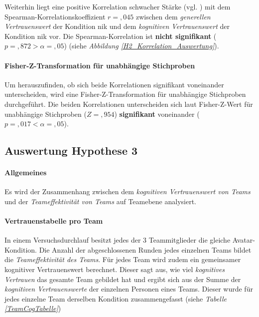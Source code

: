 \documentclass[a4paper,11pt]{article}%
\renewcommand{\\}{\vspace*{0.5\baselineskip} \newline}
\begin{document}
{Weiterhin liegt eine positive Korrelation schwacher Stärke (vgl. \citep[S. 77-81]{cohen2013statistical}) mit dem Spearman-Korrelationskoeffizient $r = ,045$ zwischen dem \textit{generellen Vertrauenswert} der Kondition \newline \ac{nik} und dem \textit{kognitiven Vertrauenswert} der Kondition \ac{nik} vor. Die Spearman-Korrelation ist \textbf{nicht signifikant} ($p = ,872 > \alpha = ,05$) (siehe \textit{Abbildung \ref{H2_Korrelation_Auswertung}}).

\paragraph{Fisher-Z-Transformation für unabhängige Stichproben}
Um herauszufinden, ob sich beide Korrelationen signifikant voneinander unterscheiden, wird eine Fisher-Z-Transformation \citep[S. 110]{cohen2013statistical} für unabhängige Stichproben durchgeführt.
Die beiden Korrelationen unterscheiden sich laut Fisher-Z-Wert für unabhängige Stichproben ($Z =,954$) \textbf{signifikant} voneinander ($p =,017 < \alpha =,05$).

\newpage
\clearpage
\subsection{Auswertung Hypothese 3}
\label{Auswertung Hypothese 3}
\paragraph{Allgemeines}
Es wird der Zusammenhang zwischen dem \textit{kognitiven Vertrauenswert von Teams} und der \textit{Teameffektivität von Teams} auf Teamebene analysiert.

\paragraph{Vertrauenstabelle pro Team}
In einem Versuchsdurchlauf besitzt jedes der 3 Teammitglieder die gleiche Avatar-Kondition. Die Anzahl der abgeschlossenen Runden jedes einzelnen Teams bildet die \textit{Teameffektivität des Teams}. 
Für jedes Team wird zudem ein gemeinsamer kognitiver Vertrauenswert berechnet. Dieser sagt aus, wie viel \textit{kognitives Vertrauen} das gesamte Team gebildet hat und ergibt sich aus der Summe der \textit{kognitiven Vertrauenswerte} der einzelnen Personen eines Teams. Dieser wurde für jedes einzelne Team derselben Kondition zusammengefasst (siehe \textit{Tabelle \ref{TeamCogTabelle}})

}
\end{document}

